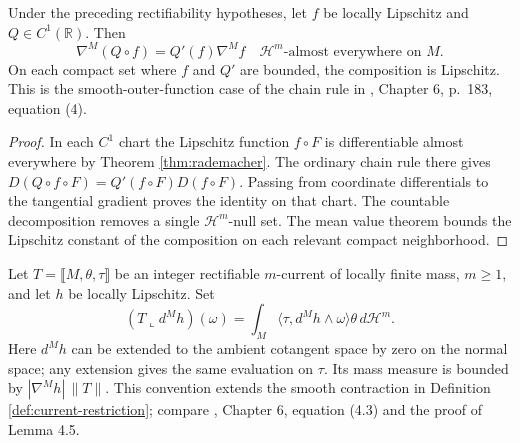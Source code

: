 \begin{lemma}\label{lem:tangential-scalar-chain}
Under the preceding rectifiability hypotheses, let $f$ be locally Lipschitz and $Q\in C^1(\mathbb R)$. Then
\[
 \nabla^M(Q\circ f)=Q'(f)\nabla^Mf
 \quad\mathcal H^m\text{-almost everywhere on }M.
\]
On each compact set where $f$ and $Q'$ are bounded, the composition is Lipschitz. This is the smooth-outer-function case of the chain rule in \cite{Sim18}, Chapter 6, p.~183, equation (4).
\end{lemma}
\begin{proof}
In each $C^1$ chart the Lipschitz function $f\circ F$ is differentiable almost everywhere by Theorem \ref{thm:rademacher}. The ordinary chain rule there gives $D(Q\circ f\circ F)=Q'(f\circ F)D(f\circ F)$. Passing from coordinate differentials to the tangential gradient proves the identity on that chart. The countable decomposition removes a single $\mathcal H^m$-null set. The mean value theorem bounds the Lipschitz constant of the composition on each relevant compact neighborhood.
\end{proof}

\begin{definition}\label{def:tangential-current-contraction}
Let $T=\llbracket M,\theta,\tau\rrbracket$ be an integer rectifiable $m$-current of locally finite mass, $m\geq1$, and let $h$ be locally Lipschitz. Set
\[
 (T\llcorner d^Mh)(\omega)
 =\int_M\langle\tau,d^Mh\wedge\omega\rangle\theta\,d\mathcal H^m.
\]
Here $d^Mh$ can be extended to the ambient cotangent space by zero on the normal space; any extension gives the same evaluation on $\tau$. Its mass measure is bounded by $|\nabla^Mh|\,\|T\|$. This convention extends the smooth contraction in Definition \ref{def:current-restriction}; compare \cite{Sim18}, Chapter 6, equation (4.3) and the proof of Lemma 4.5.
\end{definition}

